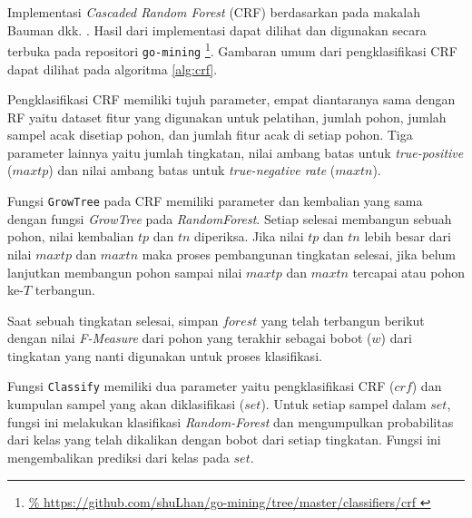 Implementasi \textit{Cascaded Random Forest} (CRF) berdasarkan pada makalah
Bauman dkk.  \cite{baumann2013cascaded}.
Hasil dari implementasi dapat dilihat dan digunakan secara terbuka pada
repositori \texttt{go-mining}
\footnote{
\url{%
https://github.com/shuLhan/go-mining/tree/master/classifiers/crf
}}.
Gambaran umum dari pengklasifikasi CRF dapat dilihat pada algoritma
\ref{alg:crf}.

Pengklasifikasi CRF memiliki tujuh parameter, empat diantaranya sama dengan RF
yaitu dataset fitur yang digunakan untuk pelatihan, jumlah pohon, jumlah sampel
acak disetiap pohon, dan jumlah fitur acak di setiap pohon.
Tiga parameter lainnya yaitu jumlah tingkatan, nilai ambang batas untuk
\textit{true-positive} ($maxtp$) dan nilai ambang batas untuk
\textit{true-negative rate} ($maxtn$).

	

Fungsi \texttt{GrowTree} pada CRF memiliki parameter dan kembalian yang sama
dengan fungsi \textit{GrowTree} pada \textit{RandomForest}.
Setiap selesai membangun sebuah pohon, nilai kembalian $tp$ dan $tn$ diperiksa.
Jika nilai $tp$ dan $tn$ lebih besar dari nilai $maxtp$ dan $maxtn$ maka proses
pembangunan tingkatan selesai, jika belum lanjutkan membangun pohon sampai
nilai $maxtp$ dan $maxtn$ tercapai atau pohon ke-$T$ terbangun.

Saat sebuah tingkatan selesai, simpan $forest$ yang telah terbangun berikut
dengan nilai \textit{F-Measure} dari pohon yang terakhir sebagai bobot ($w$)
dari tingkatan yang nanti digunakan untuk proses klasifikasi.

Fungsi \texttt{Classify} memiliki dua parameter yaitu pengklasifikasi CRF
($crf$) dan kumpulan sampel yang akan diklasifikasi ($set$).
Untuk setiap sampel dalam $set$, fungsi ini melakukan klasifikasi
\textit{Random-Forest} dan mengumpulkan probabilitas dari kelas yang telah
dikalikan dengan bobot dari setiap tingkatan.
Fungsi ini mengembalikan prediksi dari kelas pada $set$.

